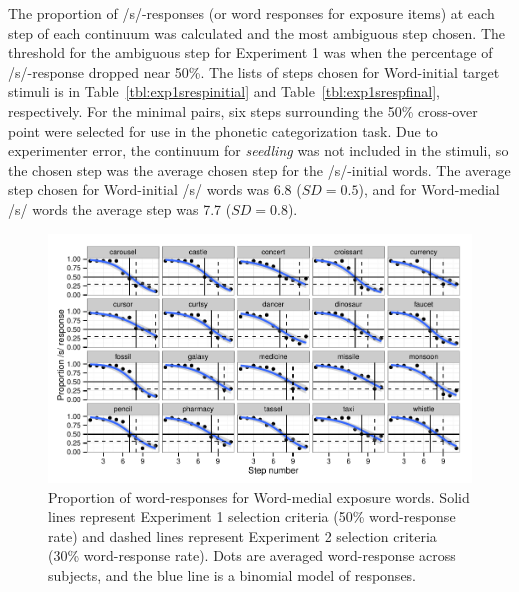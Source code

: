 The proportion of /s/-responses (or word responses for exposure items) at each step of each continuum was calculated and the most ambiguous step chosen. 
The threshold for the ambiguous step for Experiment 1 was when the percentage of /s/-response dropped near 50\%. 
The lists of steps chosen for Word-initial target stimuli is in Table~\ref{tbl:exp1srespinitial} and Table~\ref{tbl:exp1srespfinal}, respectively.
For the minimal pairs, six steps surrounding the 50\% cross-over point were selected for use in the phonetic categorization task.  
Due to experimenter error, the continuum for \emph{seedling} was not included in the stimuli, so the chosen step was the average chosen step for the /s/-initial words.  
The average step chosen for Word-initial /s/ words was 6.8 ($SD = 0.5$), and for Word-medial /s/ words the average step was 7.7 ($SD = 0.8$).


\begin{figure}[ht]
\caption{Proportion of word-responses for Word-medial exposure words. Solid lines represent Experiment 1 selection criteria (50\% word-response rate) and dashed lines represent Experiment 2 selection criteria (30\% word-response rate).  Dots are averaged word-response across subjects, and the blue line is a binomial model of responses.}
\label{fig:sfinalpretest}
\begin{center}
\includegraphics[width=\textwidth]{graphs/sfinalpretest.pdf}
\end{center}
\end{figure}


